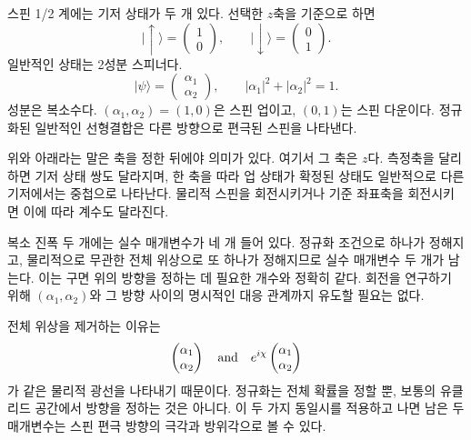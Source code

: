 스핀 1/2 계에는 기저 상태가 두 개 있다. 선택한 \(z\)축을 기준으로 하면
\begin{equation}
\lvert\uparrow\rangle=
\begin{pmatrix}1\\0\end{pmatrix},
\qquad
\lvert\downarrow\rangle=
\begin{pmatrix}0\\1\end{pmatrix}.
\end{equation}
일반적인 상태는 2성분 스피너다.
\begin{equation}
\lvert\psi\rangle=
\begin{pmatrix}\alpha_1\\\alpha_2\end{pmatrix},
\qquad
|\alpha_1|^2+|\alpha_2|^2=1.
\label{eq:l3-spinor}
\end{equation}
성분은 복소수다. \((\alpha_1,\alpha_2)=(1,0)\)은 스핀 업이고, \((0,1)\)는 스핀 다운이다. 정규화된 일반적인 선형결합은 다른 방향으로 편극된 스핀을 나타낸다.

{위}와 {아래}라는 말은 축을 정한 뒤에야 의미가 있다. 여기서 그 축은 \(z\)다. 측정축을 달리하면 기저 상태 쌍도 달라지며, 한 축을 따라 업 상태가 확정된 상태도 일반적으로 다른 기저에서는 중첩으로 나타난다. 물리적 스핀을 회전시키거나 기준 좌표축을 회전시키면 이에 따라 계수도 달라진다.

복소 진폭 두 개에는 실수 매개변수가 네 개 들어 있다. 정규화 조건으로 하나가 정해지고, 물리적으로 무관한 전체 위상으로 또 하나가 정해지므로 실수 매개변수 두 개가 남는다. 이는 구면 위의 방향을 정하는 데 필요한 개수와 정확히 같다. 회전을 연구하기 위해 \((\alpha_1,\alpha_2)\)와 그 방향 사이의 명시적인 대응 관계까지 유도할 필요는 없다.

전체 위상을 제거하는 이유는
\begin{equation}
\begin{pmatrix}\alpha_1\\\alpha_2\end{pmatrix}
\quad\hbox{and}\quad
e^{i\chi}
\begin{pmatrix}\alpha_1\\\alpha_2\end{pmatrix}
\end{equation}
가 같은 물리적 광선을 나타내기 때문이다. 정규화는 전체 확률을 정할 뿐, 보통의 유클리드 공간에서 방향을 정하는 것은 아니다. 이 두 가지 동일시를 적용하고 나면 남은 두 매개변수는 스핀 편극 방향의 극각과 방위각으로 볼 수 있다.

